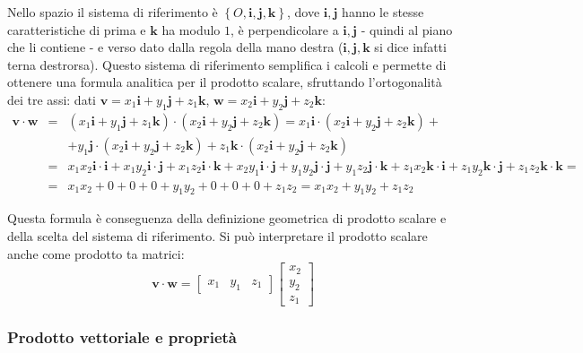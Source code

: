 \documentclass{article}
\begin{document}
Nello spazio il sistema di riferimento \`{e} $\left\{ O,\mathbf{i,j,k}%
\right\} $, dove $\mathbf{i},\mathbf{j}$ hanno le stesse caratteristiche di
prima e $\mathbf{k}$ ha modulo $1$, \`{e} perpendicolare a $\mathbf{i,j}$ -
quindi al piano che li contiene - e verso dato dalla regola della mano
destra ($\mathbf{i,j,k}$ si dice infatti terna destrorsa). Questo sistema di
riferimento semplifica i calcoli e permette di ottenere una formula
analitica per il prodotto scalare, sfruttando l'ortogonalit\`{a} dei tre
assi: dati $\mathbf{v}=x_{1}\mathbf{i}+y_{1}\mathbf{j}+z_{1}\mathbf{k}$, $%
\mathbf{w}=x_{2}\mathbf{i}+y_{2}\mathbf{j}+z_{2}\mathbf{k}$: 
\begin{eqnarray*}
\mathbf{v\cdot w} &=&\left( x_{1}\mathbf{i}+y_{1}\mathbf{j}+z_{1}\mathbf{k}%
\right) \cdot \left( x_{2}\mathbf{i}+y_{2}\mathbf{j}+z_{2}\mathbf{k}\right)
=x_{1}\mathbf{i}\cdot \left( x_{2}\mathbf{i}+y_{2}\mathbf{j}+z_{2}\mathbf{k}%
\right) + \\
&&+y_{1}\mathbf{j}\cdot \left( x_{2}\mathbf{i}+y_{2}\mathbf{j}+z_{2}\mathbf{k%
}\right) +z_{1}\mathbf{k}\cdot \left( x_{2}\mathbf{i}+y_{2}\mathbf{j}+z_{2}%
\mathbf{k}\right) \\
&=&x_{1}x_{2}\mathbf{i}\cdot \mathbf{i}+x_{1}y_{2}\mathbf{i\cdot j}%
+x_{1}z_{2}\mathbf{i}\cdot \mathbf{k+}x_{2}y_{1}\mathbf{i}\cdot \mathbf{j}%
+y_{1}y_{2}\mathbf{j\cdot j}+y_{1}z_{2}\mathbf{j}\cdot \mathbf{k+}z_{1}x_{2}%
\mathbf{k}\cdot \mathbf{i}+z_{1}y_{2}\mathbf{k\cdot j}+z_{1}z_{2}\mathbf{k}%
\cdot \mathbf{k=} \\
&=&x_{1}x_{2}+0+0+0+y_{1}y_{2}+0+0+0+z_{1}z_{2}=x_{1}x_{2}+y_{1}y_{2}+z_{1}z_{2}
\end{eqnarray*}

Questa formula \`{e} conseguenza della definizione geometrica di prodotto
scalare e della scelta del sistema di riferimento. Si pu\`{o} interpretare
il prodotto scalare anche come prodotto ta matrici:%
\begin{equation*}
\mathbf{v\cdot w}=\left[ 
\begin{array}{ccc}
x_{1} & y_{1} & z_{1}%
\end{array}%
\right] \left[ 
\begin{array}{c}
x_{2} \\ 
y_{2} \\ 
z_{1}%
\end{array}%
\right]
\end{equation*}

\subsubsection{Prodotto vettoriale e propriet\`{a}}
\end{document}

